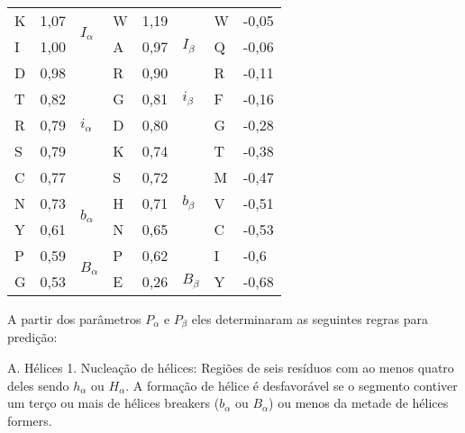 \begin{table}[]
\begin{tabular}{@{}llllllll@{}}
    \cmidrule(r){1-3}
    K & 1,07 & \multirow{2}{*}{$I_\alpha$} & W & 1,19 &                            & W                 & -0,05                \\
    \cmidrule(r){4-6}
    I & 1,00 &                             & A & 0,97 & $I_\beta$                  & Q                 & -0,06                \\
    \cmidrule(r){1-3} \cmidrule(r){4-6}
    D & 0,98 & \multirow{5}{*}{$i_\alpha$} & R & 0,90 & \multirow{3}{*}{$i_\beta$} & R                 & -0,11                \\
    T & 0,82 &                             & G & 0,81 &                            & F                 & -0,16                \\
    R & 0,79 &                             & D & 0,80 &                            & G                 & -0,28                \\
    \cmidrule(r){4-6}
    S & 0,79 &                             & K & 0,74 & \multirow{5}{*}{$b_\beta$} & T                 & -0,38                \\
    C & 0,77 &                             & S & 0,72 &                            & M                 & -0,47                \\
    \cmidrule(r){1-3}
    N & 0,73 & \multirow{2}{*}{$b_\alpha$} & H & 0,71 &                            & V                 & -0,51                \\
    Y & 0,61 &                             & N & 0,65 &                            & C                 & -0,53                \\
    \cmidrule(r){1-3}
    P & 0,59 & \multirow{2}{*}{$B_\alpha$} & P & 0,62 &                            & I                 & -0,6                 \\
    \cmidrule(r){4-6}
    G & 0,53 &                             & E & 0,26 & $B_\beta$                  & Y                 & -0,68                \\  
    \bottomrule
    \end{tabular}
    \end{table}

A partir dos parâmetros $P_\alpha$ e $P_\beta$ eles determinaram as seguintes regras para predição:

A. Hélices 
1. Nucleação de hélices: Regiões de seis resíduos com ao menos quatro deles sendo $h_\alpha$ ou $H_\alpha$. A formação de hélice é desfavorável se o segmento contiver um terço ou mais de hélices breakers ($b_\alpha$ ou $B_\alpha$) ou menos da metade de hélices formers.

